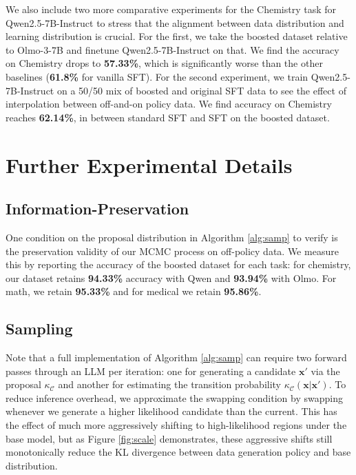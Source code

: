 \documentclass{article}
\begin{document}
We also include two more comparative experiments for the Chemistry task for Qwen2.5-7B-Instruct to stress that the alignment between data distribution and learning distribution is crucial. For the first, we take the boosted dataset relative to Olmo-3-7B and finetune Qwen2.5-7B-Instruct on that. We find the accuracy on Chemistry drops to \textbf{57.33\%}, which is significantly worse than the other baselines (\textbf{61.8\%} for vanilla SFT). For the second experiment, we train Qwen2.5-7B-Instruct on a 50/50 mix of boosted and original SFT data to see the effect of interpolation between off-and-on policy data. We find accuracy on Chemistry reaches \textbf{62.14\%}, in between standard SFT and SFT on the boosted dataset.


\section{Further Experimental Details}
\subsection{Information-Preservation}

One condition on the proposal distribution in Algorithm \ref{alg:samp} to verify is the preservation validity of our MCMC process on off-policy data. We measure this by reporting the accuracy of the boosted dataset for each task: for chemistry, our  dataset retains \textbf{94.33\%} accuracy with Qwen and \textbf{93.94\%} with Olmo. For math, we retain \textbf{95.33\%} and for medical we retain \textbf{95.86\%}. 

\subsection{Sampling}

Note that a full implementation of Algorithm \ref{alg:samp} can require two forward passes through an LLM per iteration: one for generating a candidate $\mathbf{x'}$ via the proposal $\kappa_{\mathcal{C}}$ and another for estimating the transition probability $\kappa_{\mathcal{C}}\left(\mathbf{x} | \mathbf{x'}\right)$. To reduce inference overhead, we approximate the swapping condition by swapping whenever we generate a higher likelihood candidate than the current. This has the effect of much more aggressively shifting to high-likelihood regions under the base model, but as Figure \ref{fig:scale} demonstrates, these aggressive shifts still monotonically reduce the KL divergence between data generation policy and base distribution. 
\end{document}
